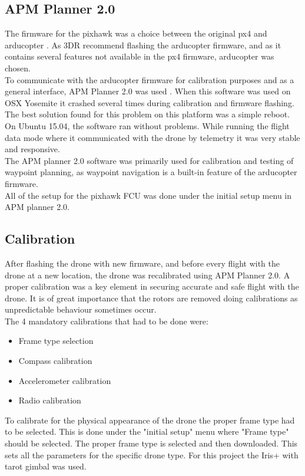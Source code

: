 \subsection*{APM Planner 2.0}
The firmware for the pixhawk was a choice between the original px4 and arducopter
\cite{Ref:Arducopter}. As 3DR recommend flashing the arducopter firmware, and as it contains several
features not available in the px4 firmware, arducopter was chosen.\\
To communicate with the arducopter firmware for calibration purposes and as a general interface,
APM Planner 2.0 was used \cite{Ref:APM2}.
When this software was used on OSX Yosemite it crashed several times
during calibration and firmware flashing. The best solution found for this problem on this platform
was a simple reboot. On Ubuntu 15.04, the software ran without problems.
While running the flight data mode where it communicated with the drone by
telemetry it was very stable and responsive.\\
The APM planner 2.0 software was primarily used for calibration and testing of waypoint planning,
as waypoint navigation is a built-in feature of the arducopter firmware.\\
All of the setup for the pixhawk FCU was done under the initial setup menu in APM planner 2.0.

\subsection*{Calibration}
After flashing the drone with new firmware, and before every flight with the drone at a new location,
the drone was recalibrated using APM Planner 2.0.
A proper calibration was a key element in securing accurate and safe
flight with the drone. It is of great importance that the rotors are removed doing calibrations as
unpredictable behaviour sometimes occur.\\
The 4 mandatory calibrations that had to be done were:
\begin{itemize}
\item Frame type selection
\item Compass calibration
\item Accelerometer calibration
\item Radio calibration
\end{itemize}

To calibrate for the physical appearance of the drone the proper frame type had to be selected.
This is done under the "initial setup" menu where "Frame type" should be selected. The proper frame
type
is selected and then downloaded. This sets all the parameters for the specific drone type. For this
project the Iris+ with tarot gimbal was used.\\

